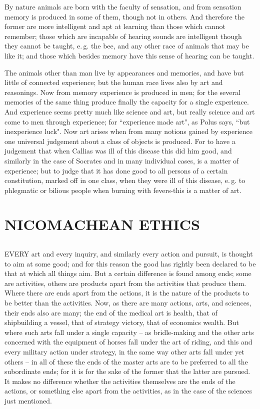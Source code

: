 \documentclass[12pt]{article}
\begin{document}
    By nature animals are born with the faculty of sensation, and from
sensation memory is produced in some of them, though not in others.
And therefore the former are more intelligent and apt at learning than
those which cannot remember; those which are incapable of hearing
sounds are intelligent though they cannot be taught, e.\,g. the bee, and
any other race of animals that may be like it; and those which besides
memory have this sense of hearing can be taught.

    The animals other than man live by appearances and memories, and
have but little of connected experience; but the human race lives also
by art and reasonings. Now from memory experience is produced in
men; for the several memories of the same thing produce finally the
capacity for a single experience. And experience seems pretty much
like science and art, but really science and art come to men through
experience; for ``experience made art", as Polus says, ``but
inexperience luck". Now art arises when from many notions gained by
experience one universal judgement about a class of objects is
produced. For to have a judgement that when Callias was ill of this
disease this did him good, and similarly in the case of Socrates and
in many individual cases, is a matter of experience; but to judge that
it has done good to all persons of a certain constitution, marked
off in one class, when they were ill of this disease, e.\,g. to
phlegmatic or bilious people when burning with fevers-this is a matter
of art.

\section{NICOMACHEAN ETHICS}

\subsection{}
  EVERY art and every inquiry, and similarly every action and pursuit,
is thought to aim at some good; and for this reason the good has
rightly been declared to be that at which all things aim. But a
certain difference is found among ends; some are activities, others
are products apart from the activities that produce them. Where
there are ends apart from the actions, it is the nature of the
products to be better than the activities. Now, as there are many
actions, arts, and sciences, their ends also are many; the end of
the medical art is health, that of shipbuilding a vessel, that of
strategy victory, that of economics wealth. But where such arts fall
under a single capacity -- as bridle-making and the other arts concerned
with the equipment of horses fall under the art of riding, and this
and every military action under strategy, in the same way other arts
fall under yet others -- in all of these the ends of the master arts
are to be preferred to all the subordinate ends; for it is for the
sake of the former that the latter are pursued. It makes no difference
whether the activities themselves are the ends of the actions, or
something else apart from the activities, as in the case of the
sciences just mentioned.
\end{document}
